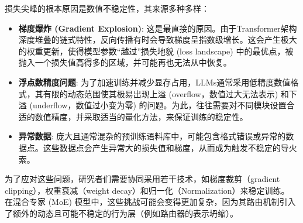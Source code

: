 损失尖峰的根本原因是数值不稳定性，其来源多种多样：
\begin{itemize}
    \item \textbf{梯度爆炸 (Gradient Explosion)}\cite{Pascanu2012OnTD}: 这是最直接的原因。由于Transformer架构深度堆叠的链式特性，反向传播有时会导致梯度呈指数级增长。这会产生极大的权重更新，使得模型参数“越过”损失地貌 (loss landscape) 中的最优点，被抛入一个损失值高得多的区域，并可能再也无法从中恢复。

    \item \textbf{浮点数精度问题}: 为了加速训练并减少显存占用，LLMs通常采用低精度数值格式，其有限的动态范围使其极易出现上溢 (overflow，数值过大无法表示) 和下溢 (underflow，数值过小变为零) 的问题。为此，往往需要对不同模块设置合适的数值精度，并采取适当的量化方法，来保证训练的稳定性。

    \item \textbf{异常数据}: 庞大且通常混杂的预训练语料库中，可能包含格式错误或异常的数据点。这些数据点会产生异常大的损失值和梯度，从而成为触发不稳定的导火索。
\end{itemize}

为了应对这些问题，研究者们需要协同采用若干技术，如梯度裁剪（gradient clipping），权重衰减（weight decay）和归一化（Normalization）来稳定训练\cite{Rybakov2024MethodsOI,Wortsman2023SmallscalePF}。
在混合专家 (MoE) 模型中，这些挑战可能会变得更加复杂，因为其路由机制引入了额外的动态且可能不稳定的行为层（例如路由器的表示坍缩）。


